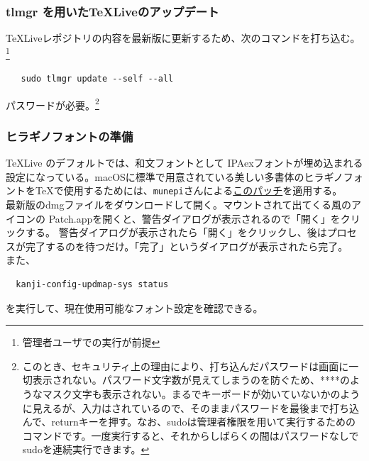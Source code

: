 \documentclass[a4paper]{ltjsreport}
\newcommand{\link}[2]{\href{#2}{#1}}
\begin{document}
\subsubsection{tlmgr を用いた\TeX Liveのアップデート}
\TeX Liveレポジトリの内容を最新版に更新するため、次のコマンドを打ち込む。\footnote{管理者ユーザでの実行が前提}
\begin{lstlisting}
   sudo tlmgr update --self --all
  \end{lstlisting}
パスワードが必要。\footnote{このとき、セキュリティ上の理由により、打ち込んだパスワードは画面に一切表示されない。パスワード文字数が見えてしまうのを防ぐため、****のようなマスク文字も表示されない。まるでキーボードが効いていないかのように見えるが、入力はされているので、そのままパスワードを最後まで打ち込んで、returnキーを押す。なお、sudoは管理者権限を用いて実行するためのコマンドです。一度実行すると、それからしばらくの間はパスワードなしでsudoを連続実行できます。}
\subsubsection{ヒラギノフォントの準備}
\TeX Live のデフォルトでは、和文フォントとして IPAexフォントが埋め込まれる設定になっている。macOSに標準で用意されている美しい多書体のヒラギノフォントを\TeX で使用するためには、\verb|munepi|さんによる\link{このパッチ}{https://github.com/munepi/bibunsho7-patch/releases}を適用する。\\
最新版のdmgファイルをダウンロードして開く。マウントされて出てくる風のアイコンの Patch.appを開くと、警告ダイアログが表示されるので「開く」をクリックする。
警告ダイアログが表示されたら「開く」をクリックし、後はプロセスが完了するのを待つだけ。「完了」というダイアログが表示されたら完了。\\
また、
\begin{lstlisting}
  kanji-config-updmap-sys status
  \end{lstlisting}
を実行して、現在使用可能なフォント設定を確認できる。
\end{document}
